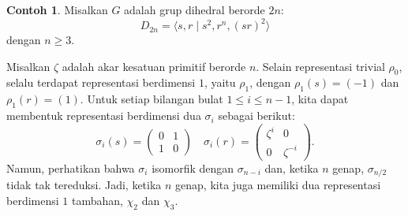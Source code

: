 \documentclass[12pt]{article}
\theoremstyle{plain}
\theoremstyle{definition}
\newtheorem{example}[theorem]{Contoh}
\theoremstyle{remark}
\numberwithin{equation}{section}
\begin{document}
\begin{example}
Misalkan $G$ adalah grup dihedral berorde $2n$:
\[
D_{2n} = \langle s,r \mid s^2, r^n, (sr)^2 \rangle
\]
dengan $n \ge 3$.

Misalkan $\zeta$ adalah akar kesatuan primitif berorde $n$.
Selain representasi trivial $\rho_0$,
selalu terdapat representasi berdimensi $1$, yaitu $\rho_1$,
dengan $\rho_1(s)=(-1)$ dan $\rho_1(r)=(1)$.
Untuk setiap bilangan bulat $1 \le i \le n-1$, kita dapat membentuk representasi berdimensi dua
$\sigma_i$ sebagai berikut:
\[
\sigma_i(s) = \begin{pmatrix} 0&1\\1&0 \end{pmatrix} \quad
\sigma_i(r) = \begin{pmatrix} \zeta^i&0\\0&\zeta^{-i} \end{pmatrix} .
\]
Namun, perhatikan bahwa $\sigma_i$ isomorfik dengan $\sigma_{n-i}$
dan, ketika $n$ genap, $\sigma_{n/2}$
tidak tak tereduksi.
Jadi, ketika $n$ genap, kita juga memiliki dua representasi
berdimensi $1$ tambahan,
$\chi_2$ dan $\chi_3$.


\end{example}
\end{document}
